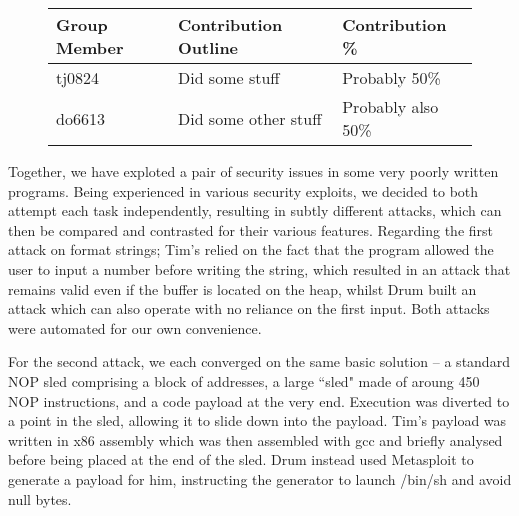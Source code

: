 \begin{figure}[h]
\centering
\begin{tabular}{|l|l|l|}
\hline
{\bf Group Member} & {\bf Contribution Outline} & {\bf Contribution \%} \\
\hline
tj0824 & Did some stuff & Probably 50\% \\
do6613 & Did some other stuff & Probably also 50\% \\
\hline
\end{tabular}
\end{figure}

Together, we have exploted a pair of security issues in some very poorly written programs. Being experienced in various
security exploits, we decided to both attempt each task independently, resulting in subtly different attacks, which can
then be compared and contrasted for their various features. Regarding the first attack on format strings; Tim's relied
on the fact that the program allowed the user to input a number before writing the string, which resulted in an attack
that remains valid even if the buffer is located on the heap, whilst Drum built an attack which can also operate with
no reliance on the first input. Both attacks were automated for our own convenience.

For the second attack, we each converged on the same basic solution -- a standard NOP sled comprising a block of
addresses, a large ``sled" made of aroung 450 NOP instructions, and a code payload at the very end. Execution was
diverted to a point in the sled, allowing it to slide down into the payload. Tim's payload was written in x86 assembly
which was then assembled with gcc and briefly analysed before being placed at the end of the sled. Drum instead used
Metasploit to generate a payload for him, instructing the generator to launch /bin/sh and avoid null bytes.
